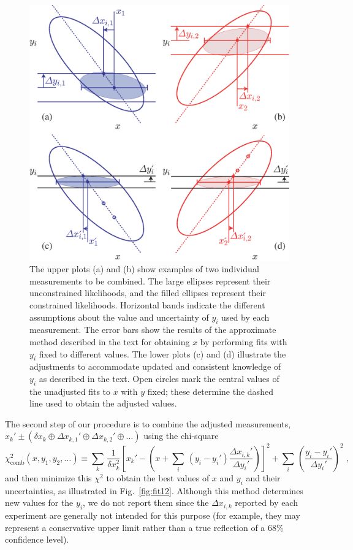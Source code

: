 \begin{figure}
\begin{center}
\includegraphics[width=6.0in]{figures/meth/figure2.eps}
\end{center}
\caption{The upper plots (a) and (b) show examples of two individual
  measurements to be combined. The large ellipses represent their
  unconstrained likelihoods, and the filled ellipses represent their
  constrained likelihoods. Horizontal bands indicate the different
  assumptions about the value and uncertainty of $y_i$ used by each
  measurement. The error bars show the results of the approximate
  method described in the text for obtaining $x$ by performing fits
  with $y_i$ fixed to different values. The lower plots (c) and (d)
  illustrate the adjustments to accommodate updated and consistent
  knowledge of $y_i$ as described in the text. Open circles mark the
  central values of the unadjusted fits to $x$ with $y$ fixed; these
  determine the dashed line used to obtain the adjusted values. }
\label{fig:multifit}
\end{figure}

The second step of our procedure is to combine the adjusted
measurements, $x_k'\pm (\delta x_k\oplus \Delta x_{k,1}'\oplus \Delta
x_{k,2}'\oplus\ldots)$ using the chi-square 
\begin{equation}
\chi^2_{\text{comb}}(x,y_1,y_2,\ldots) \equiv \sum_k\,
\frac{1}{\delta x_k^2}\left[
x_k' - \left(x + \sum_i\,(y_i-y_i')\frac{\Delta x_{i,k}'}{\Delta y_i'}\right)
\right]^2 + \sum_i\,
\left(\frac{y_i - y_i'}{\Delta y_i'}\right)^2 \; ,
\end{equation}
and then minimize this $\chi^2$ to obtain the best values of $x$ and
$y_i$ and their uncertainties, as illustrated in
Fig.~\ref{fig:fit12}. Although this method determines new values for
the $y_i$, we do not report them since the $\Delta x_{i,k}$ reported
by each experiment are generally not intended for this purpose (for
example, they may represent a conservative upper limit rather than a
true reflection of a 68\% confidence level).

